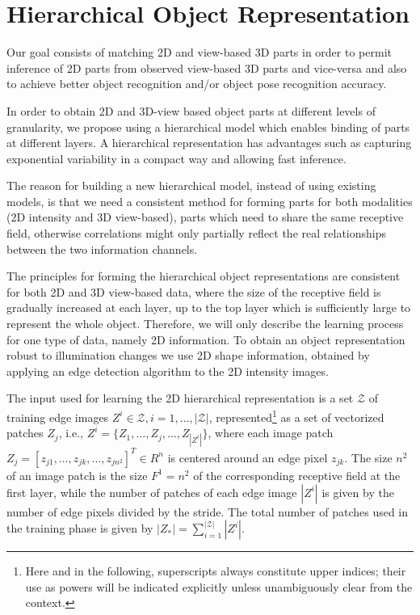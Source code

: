 \documentclass[runningheads]{llncs}
\begin{document}
\section{Hierarchical Object Representation} 
\label{sec:learning}    

Our goal consists of matching 2D and view-based 3D parts in order to permit inference of 2D parts from observed view-based 3D parts and vice-versa and also to achieve better object recognition and/or object pose recognition accuracy.  

In order to obtain 2D and 3D-view based object parts at different levels of granularity, we propose using a hierarchical model which enables binding of parts at different layers. A hierarchical representation has advantages such as capturing exponential variability in a compact way and allowing fast inference.

The reason for building a new hierarchical model, instead of using existing models, is that we need a consistent method for forming parts for both modalities (2D intensity and 3D view-based), parts which need to share the same receptive field, otherwise correlations might only partially reflect the real relationships between the two information channels.

The principles for forming the hierarchical object representations are consistent for both 2D and 3D view-based data, where the size of the receptive field is gradually increased at each layer, up to the top layer which is sufficiently large to represent the whole object. Therefore, we will only describe the learning process for one type of data, namely 2D information. To obtain an object representation robust to illumination changes we use 2D shape information, obtained by applying an edge detection algorithm to the 2D intensity images.

The input used for learning the 2D hierarchical representation is a set $\mathcal{Z}$ of training edge images $Z^i \in \mathcal{Z}, i=1,\ldots,|\mathcal{Z}|$, represented\footnote{Here and in the following, superscripts always constitute upper indices; their use as powers will be indicated explicitly unless unambiguously clear from the context.} as a set of vectorized patches $Z_j$, i.e., $Z^i=\{Z_1,\ldots,Z_j,\ldots,Z_{|Z^i|}\}$, where each image patch
$Z_j=[z_{j1},\ldots,z_{jk},\ldots,z_{jn^2}]^T \in R^n$ is centered around an edge pixel $z_{jk}$. The size $n^2$ of an image patch is the size $F^1=n^2$ of the corresponding receptive field at the first layer, while the number of patches of each edge image $|Z^i|$ is given by the number of edge pixels divided by the stride. The total number of patches used in the training phase is given by $|Z_*|=\sum_{i=1}^{|\mathcal{Z}|} |Z^i|$.
\end{document}
